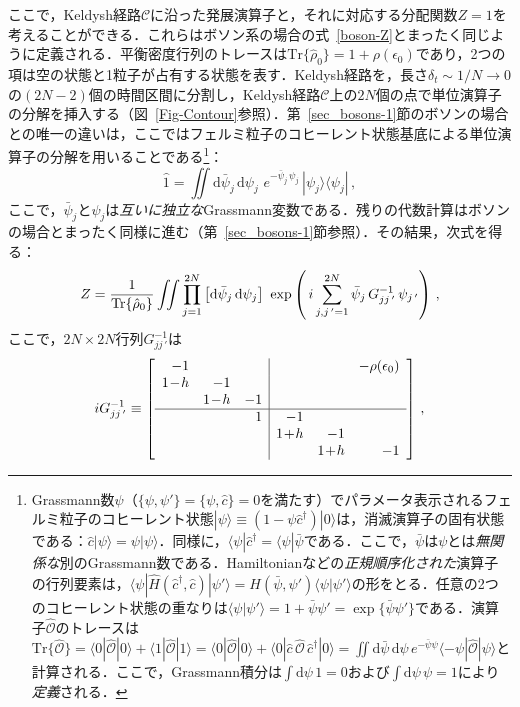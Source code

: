 \documentclass[a4paper,11pt]{ltjsarticle}
\def\Tr{\mathrm{Tr}}
\def\d{\mathrm{d}}
\begin{document}
ここで，Keldysh経路$\mathcal{C}$に沿った発展演算子と，それに対応する分配関数$Z=1$を考えることができる．これらはボソン系の場合の式~\eqref{boson-Z}とまったく同じように定義される．平衡密度行列のトレースは$\Tr\{\hat{\rho}_0\}=1+\rho(\epsilon_0)$であり，2つの項は空の状態と1粒子が占有する状態を表す．Keldysh経路を，長さ$\delta_t\sim 1/N\to 0$の$(2N-2)$個の時間区間に分割し，Keldysh経路$\mathcal{C}$上の$2N$個の点で単位演算子の分解を挿入する（図~\ref{Fig-Contour}参照）．第~\ref{sec_bosons-1}節のボソンの場合との唯一の違いは，ここではフェルミ粒子のコヒーレント状態基底による単位演算子の分解を用いることである\footnote{Grassmann数$\psi$（$\{\psi,\psi'\}=\{\psi,\hat{c}\}=0$を満たす）でパラメータ表示されるフェルミ粒子のコヒーレント状態$|\psi\rangle\equiv (1-\psi
\hat{c}^\dagger)|0\rangle$は，消滅演算子の固有状態である：$\hat{c}|\psi\rangle=\psi|\psi\rangle$．同様に，$\langle\psi|\hat{c}^\dagger=\langle\psi|\bar{\psi}$である．ここで，$\bar{\psi}$は$\psi$とは{\em 無関係な}別のGrassmann数である．Hamiltonianなどの{\em 正規順序化された}演算子の行列要素は，$\langle\psi|\hat{H}(\hat{c}^\dagger,\hat{c})|\psi'\rangle =
H(\bar{\psi},\psi') \langle\psi|\psi'\rangle$の形をとる．任意の2つのコヒーレント状態の重なりは$\langle\psi|\psi'\rangle=1+\bar\psi\psi'=\exp\{\bar\psi\psi'\}$である．演算子$\hat{\mathcal{O}}$のトレースは$\Tr\big\{\hat{\mathcal{O}}\big\}= \langle 0| \hat{\mathcal{O}}|0
\rangle + \langle 1| \hat{\mathcal{O}}|1 \rangle = \langle 0|
\hat{\mathcal{O}}|0 \rangle + \langle 0|\hat{c}\,
\hat{\mathcal{O}}\, \hat{c}^\dagger |0 \rangle=  \iint\d\bar{\psi}\,
\d\psi\,
e^{-\bar{\psi}\psi}\langle-\psi|\hat{\mathcal{O}}|\psi\rangle $と計算される．ここで，Grassmann積分は$\int\! \d\psi\,
1=0$および$\int\! \d\psi\, \psi =1$により{\em 定義}される．}：
\begin{equation}\label{fermion-unity}
\hat{1}=\iint\d\bar{\psi}_j\, \d\psi_j\,\,
e^{-\bar{\psi}_{j}\,\psi_{j}}\, |\psi_j\rangle\langle\psi_j|\, ,
\end{equation}
ここで，$\bar{\psi}_j$と$\psi_j$は{\em 互いに独立な}Grassmann変数である．残りの代数計算はボソンの場合とまったく同様に進む（第~\ref{sec_bosons-1}節参照）．その結果，次式を得る：
\begin{equation}\label{fermion-Z}
Z={1\over \Tr\{\hat{\rho}_{0}\}}\iint
\prod\limits_{j=1}^{2N}\left[\d\bar{\psi}_j\, \d\psi_j \right] \,\,
\exp\left(\,i \sum\limits_{j,j\,'=1}^{2N} \bar{\psi}_{j}\,
G^{-1}_{jj\,'}\,\psi_{j\,'}\right)\, ,
\end{equation}
ここで，$2N \times 2N$行列$G^{-1}_{jj\,'}$は
\begin{equation}\label{fermion-G-matrix}
  iG^{-1}_{jj\,'}\equiv
\left[\begin{array}{rrr|rrr}
 -1   &      &    &   &   &   -\rho(\epsilon_0) \\
  1\!-\!h & -1   &    &   &   &                 \\
      &  1\!-\!h & -1 &   &   &                 \\ \hline
     &     &  1 & -1 &    &                 \\
     &     &    &1\!+\!h & -1 &                 \\
     &     &    &    & 1\!+\!h&  -1
 \end{array} \right]\, ,
\end{equation}
\end{document}
